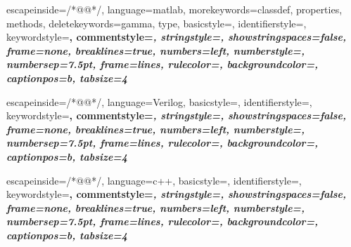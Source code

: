 

 {
	escapeinside={/*@}{@*/},
	language=matlab, 
	morekeywords={classdef, properties, methods},
	deletekeywords={gamma, type},
	basicstyle=\ttfamily \small  \color{inlineBoxListingText},
	identifierstyle=\ttfamily \small \color{black},
	keywordstyle=\bfseries \color{keywordcolor},
	commentstyle=\itshape \color{commentcolor},
	stringstyle=\ttfamily \color{stringcolor},
	showstringspaces=false,
	frame=none,
	breaklines=true, 
	numbers=left,
	numberstyle={\llabelput \scriptsize \ttfamily \color{numbercolor}}, 
	numbersep=7.5pt,
	frame=lines,
	rulecolor=\color{bordercolor},
	backgroundcolor=\color{backgroundcolor},
	captionpos=b,
	tabsize=4
}

 {
	escapeinside={/*@}{@*/},
	language=Verilog,
	basicstyle=\ttfamily \small,
	identifierstyle=\ttfamily \small \color{inlineBoxListingText},
	keywordstyle=\bfseries \color{keywordcolor},
	commentstyle=\itshape \color{commentcolor},
	stringstyle=\ttfamily \color{stringcolor},
	showstringspaces=false,
	frame=none,
	breaklines=true, 
	numbers=left,
	numberstyle={\llabelput \scriptsize \ttfamily \color{numbercolor}},
	numbersep=7.5pt,
	frame=lines,
	rulecolor=\color{bordercolor},
	backgroundcolor=\color{backgroundcolor},
	captionpos=b,    
	tabsize=4
}

 {
	escapeinside={/*@}{@*/},
	language=c++,
	basicstyle=\ttfamily \small \color{inlineBoxListingText},
	identifierstyle=\ttfamily \small \color{black},
	keywordstyle=\bfseries \color{keywordcolor},
	commentstyle=\itshape \color{commentcolor},
	stringstyle=\ttfamily \color{stringcolor},
	showstringspaces=false,
	frame=none,
	breaklines=true, 
	numbers=left,
	numberstyle={\llabelput \scriptsize \ttfamily \color{numbercolor}},
	numbersep=7.5pt,
	frame=lines,
	rulecolor=\color{bordercolor},
	backgroundcolor=\color{backgroundcolor},
	captionpos=b,    
	tabsize=4
}

\makeatletter
{}   
\newlength{\llabelsep}

